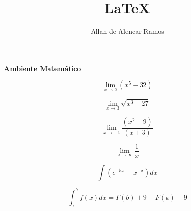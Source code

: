 \documentclass[12pt, a4paper]{article}
\begin{document}
\title{LaTeX}
\author{Allan de Alencar Ramos}
\maketitle

\begin{center}
\large\textbf{Ambiente Matemático}
\end{center}
\vspace{0.5cm}

\begin{equation}
\lim_{x \rightarrow 2} (x^{5} - 32)
\end{equation}

\begin{equation}
\lim_{x \rightarrow 3} \sqrt{x^{3} - 27}
\end{equation}

\begin{equation}
\lim_{x \rightarrow -3} \frac{(x^{2} - 9)}{(x + 3)} 
\end{equation}

\begin{equation}
\lim_{x \rightarrow \infty} \frac{1}{x} 
\end{equation}

\begin{equation}
\int (e^{-5x} + x^{-x}) dx
\end{equation}

\begin{equation}
\int_{a}^{b} f(x) dx = F(b) + 9 - F(a) - 9
\end{equation}
\end{document}
